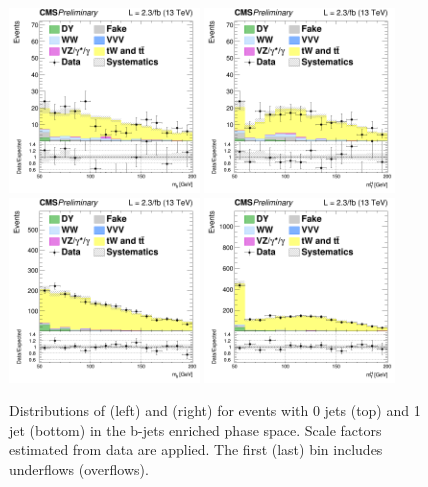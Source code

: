 \begin{figure}[htb]
\centering
\includegraphics[width=0.45\textwidth]{images/13TeV/cratio_hww2l2v_13TeV_top_of0j_mll.png}
\includegraphics[width=0.45\textwidth]{images/13TeV/cratio_hww2l2v_13TeV_top_of0j_mth.png}
\includegraphics[width=0.45\textwidth]{images/13TeV/cratio_hww2l2v_13TeV_top_of1j_mll.png}
\includegraphics[width=0.45\textwidth]{images/13TeV/cratio_hww2l2v_13TeV_top_of1j_mth.png}
\caption{
Distributions of \mll (left) and \mt (right) for events with 0 jets (top) and 1 jet (bottom) in the b-jets enriched phase space. Scale factors estimated from data are applied. The first (last) bin includes underflows (overflows).
}
\label{fig:TopCtrl125}
\end{figure}


